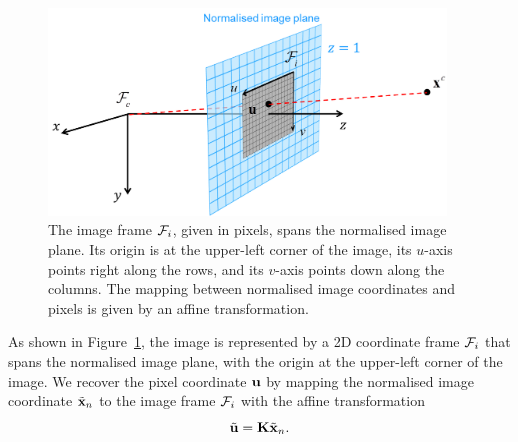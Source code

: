\begin{figure}[htb]
    \centering
    \includegraphics[height=5.5cm]{figures/perspective-camera-model.png}
    \caption{The image frame $\mathcal{F}_i$, given in pixels, spans the normalised image plane.
    Its origin is at the upper-left corner of the image, its $u$-axis points right along the rows, and its $v$-axis points down along the columns.
    The mapping between normalised image coordinates and pixels is given by an affine transformation.
    }
    \label{fig:perspective-camera-model}
\end{figure}
%
As shown in Figure~\ref{fig:perspective-camera-model}, the image is represented by a 2D coordinate frame $\mathcal{F}_i$ that spans the normalised image plane, with the origin at the upper-left corner of the image.
We recover the pixel coordinate ${\boldsymbol{\mathbf{u}}}$ by mapping the normalised image coordinate $\tilde{{\boldsymbol{\mathbf{x}}}}_n$ to the image frame $\mathcal{F}_i$ with the affine transformation
\begin{equation}
  \tilde{{\boldsymbol{\mathbf{u}}}} = {\boldsymbol{\mathbf{K}}} \tilde{{\boldsymbol{\mathbf{x}}}}_n.
\end{equation}

